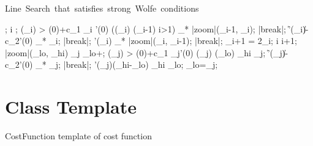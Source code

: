 \begin{algorithm}
    \mbox{Line Search that satisfies strong Wolfe conditions}
    \begin{program}
        \BEGIN
        ;
        i ;
         \DO
        \IF \phi(\alpha_i) > \phi(0)+c_1 \alpha_i \phi'(0) \OR
            (\phi(\alpha_i) \ge \phi(\alpha_{i-1}) \AND i>1)
        \THEN
            \alpha_* \leftarrow |zoom|(\alpha_{i-1}, \alpha_i);
            |break|;
        \FI
        \IF \|\phi'(\alpha_i)\| \le -c_2\phi'(0)
        \THEN
            \alpha_* \leftarrow \alpha_i;
            |break|;
        \FI
        \IF \phi'(\alpha_i) 
        \THEN
            \alpha_* \leftarrow |zoom|(\alpha_i, \alpha_{i-1});
            |break|;
        \FI
        \alpha_{i+1} = 2\alpha_i;
        i \leftarrow i+1;
        \OD
        \WHERE
        \FUNCT |zoom|(\alpha_{lo}, \alpha_{hi}) \BODY
             \DO
                \EXP \alpha_j \leftarrow \alpha_{lo}+;
                \IF \phi(\alpha_j) > \phi(0)+c_1 \alpha_j\phi'(0) \OR %
                    \phi(\alpha_j) \ge \phi(\alpha_{lo})
                \THEN
                    \alpha_{hi} \leftarrow \alpha_j;
                \ELSE
                    \IF \|\phi'(\alpha_j)\| \le -c_2\phi'(0)
                    \THEN
                        \alpha_* \leftarrow \alpha_j;
                        |break|;
                    \FI
                    \IF \phi'(\alpha_j)(\alpha_{hi}-\alpha_{lo}) 
                    \THEN
                        \alpha_{hi} \leftarrow \alpha_{lo};
                    \FI
                    \alpha_{lo}=\alpha_j;
                \FI
            \OD
            \ENDEXP \ENDFUNCT
        \END
    \end{program}
\end{algorithm}

\section{ Class Template}\label{chapter:ref:Minimization: costfunction class}

\begin{classdesc}{CostFunction}{}
template of cost function
\end{classdesc}

